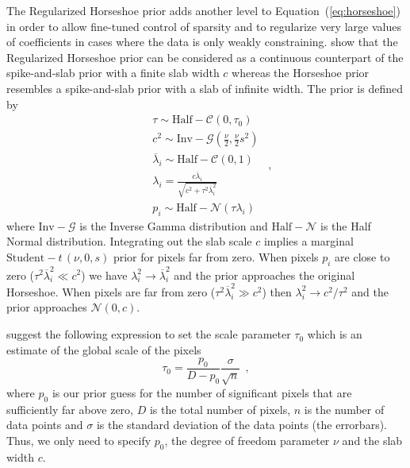 \documentclass[12pt,dvipsnames]{report}
\newcommand{\hquad}{~~}
\begin{document}
The Regularized Horseshoe prior adds another level to Equation~(\ref{eq:horseshoe}) in order to allow fine-tuned control of sparsity and to regularize very large values of coefficients in cases where the data is only weakly constraining.
\citet{10.1214/17-EJS1337SI} show that the Regularized Horseshoe prior can be considered as a continuous counterpart of the spike-and-slab prior with a finite slab width $c$ whereas the Horseshoe prior resembles a spike-and-slab prior with a slab of infinite width.
The prior is defined by
\begin{equation}
\begin{aligned}
    &\tau  \sim \mathrm{Half}-\mathcal{C}\left(0, \tau_{0}\right)\\
    &c^{2}  \sim \mathrm{Inv}-\mathcal{G}\left(\frac{\nu}{2}, \frac{\nu}{2} s^{2}\right) \\
    &\overline{\lambda}_{i}  \sim \mathrm{Half}-\mathcal{C}(0,1)\\
    &\lambda_{i} =\frac{c \overline{\lambda}_{i}}{\sqrt{c^{2}+\tau^{2} \overline{\lambda}_{i}^{2}}} \\
    &p_{i}  \sim \mathrm{Half}-\mathcal{N}\left(\tau \lambda_{i}\right) 
\end{aligned}
\hquad,
    \label{eq:reg_horseshoe}
\end{equation}
where $\mathrm{Inv}-\mathcal{G}$ is the Inverse Gamma distribution and  $\mathrm{Half}-\mathcal{N}$ is the Half Normal distribution.
Integrating out the slab scale $c$ implies a marginal $\mathrm{Student}-\mathit{t}\,(\nu,0,s)$ prior for pixels far from zero.
When pixels $p_i$ are close to zero ($\tau^2\overline{\lambda}_i^2\ll c^2$) we have $\lambda_i^2\rightarrow\overline{\lambda}_i^2$ and the prior approaches the original Horseshoe.
When pixels are far from zero ($\tau^2\overline{\lambda}_i^2\gg c^2$) then $\lambda_i^2\rightarrow c^2/\tau^2$ and the prior approaches $\mathcal{N}(0, c)$.

\citet{10.1214/17-EJS1337SI} suggest the following expression to set the scale parameter $\tau_0$ which is an estimate of the global scale of the pixels 
\begin{equation}
    \tau_0=\frac{p_0}{D-p_0}\frac{\sigma}{\sqrt{n}}
    \hquad,
    \label{eq:horseshoe_tau0}
\end{equation}
where $p_0$ is our prior guess for the number of significant pixels that are sufficiently far above zero, $D$ is the total number of pixels, $n$ is the number of data points and $\sigma$ is the standard deviation of the data points (the errorbars).
Thus, we only need to specify $p_0$, the degree of freedom parameter $\nu$ and the slab width $c$.
\end{document}
